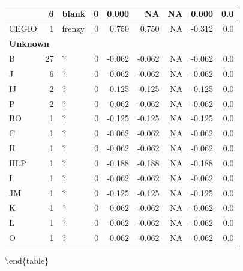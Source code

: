 \documentclass[
  letterpaper,
  DIV=11,
  numbers=noendperiod]{scrreprt}
\begin{document}
\begin{tabular}[t]{l|r|l|r|r|r|r|r|r}
\hline
\hspace{1em} & 6 & blank & 0 & 0.000 & NA & NA & 0.000 & 0.0\\
\hline
\hspace{1em}CEGIO & 1 & frenzy & 0 & 0.750 & 0.750 & NA & -0.312 & 0.0\\
\hline
\multicolumn{9}{l}{\textbf{Unknown}}\\
\hline
\hspace{1em}B & 27 & ? & 0 & -0.062 & -0.062 & NA & -0.062 & 0.0\\
\hline
\hspace{1em}J & 6 & ? & 0 & -0.062 & -0.062 & NA & -0.062 & 0.0\\
\hline
\hspace{1em}IJ & 2 & ? & 0 & -0.125 & -0.125 & NA & -0.125 & 0.0\\
\hline
\hspace{1em}P & 2 & ? & 0 & -0.062 & -0.062 & NA & -0.062 & 0.0\\
\hline
\hspace{1em}BO & 1 & ? & 0 & -0.125 & -0.125 & NA & -0.125 & 0.0\\
\hline
\hspace{1em}C & 1 & ? & 0 & -0.062 & -0.062 & NA & -0.062 & 0.0\\
\hline
\hspace{1em}H & 1 & ? & 0 & -0.062 & -0.062 & NA & -0.062 & 0.0\\
\hline
\hspace{1em}HLP & 1 & ? & 0 & -0.188 & -0.188 & NA & -0.188 & 0.0\\
\hline
\hspace{1em}I & 1 & ? & 0 & -0.062 & -0.062 & NA & -0.062 & 0.0\\
\hline
\hspace{1em}JM & 1 & ? & 0 & -0.125 & -0.125 & NA & -0.125 & 0.0\\
\hline
\hspace{1em}K & 1 & ? & 0 & -0.062 & -0.062 & NA & -0.062 & 0.0\\
\hline
\hspace{1em}L & 1 & ? & 0 & -0.062 & -0.062 & NA & -0.062 & 0.0\\
\hline
\hspace{1em}O & 1 & ? & 0 & -0.062 & -0.062 & NA & -0.062 & 0.0\\
\hline
\end{tabular}

\textbackslash end\{table\}
\end{document}
